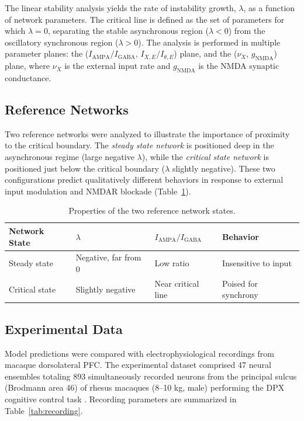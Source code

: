 \documentclass[11pt]{article}
\begin{document}
The linear stability analysis yields the rate of instability growth, $\lambda$, as a function of network parameters. The critical line is defined as the set of parameters for which $\lambda = 0$, separating the stable asynchronous region ($\lambda < 0$) from the oscillatory synchronous region ($\lambda > 0$). The analysis is performed in multiple parameter planes: the ($I_\text{AMPA}/I_\text{GABA}$, $I_{X,E}/I_{\theta,E}$) plane, and the ($\nu_X$, $g_\text{NMDA}$) plane, where $\nu_X$ is the external input rate and $g_\text{NMDA}$ is the NMDA synaptic conductance.

\subsection{Reference Networks}

Two reference networks were analyzed to illustrate the importance of proximity to the critical boundary. The \textit{steady state network} is positioned deep in the asynchronous regime (large negative $\lambda$), while the \textit{critical state network} is positioned just below the critical boundary ($\lambda$ slightly negative). These two configurations predict qualitatively different behaviors in response to external input modulation and NMDAR blockade (Table~\ref{tab:states}).

\begin{table}[htbp]
\centering
\caption{Properties of the two reference network states.}
\label{tab:states}
\begin{tabular}{llll}
\toprule
Network State & $\lambda$ & $I_\text{AMPA}/I_\text{GABA}$ & Behavior \\
\midrule
Steady state & Negative, far from 0 & Low ratio & Insensitive to input \\
Critical state & Slightly negative & Near critical line & Poised for synchrony \\
\bottomrule
\end{tabular}
\end{table}

\subsection{Experimental Data}

Model predictions were compared with electrophysiological recordings from macaque dorsolateral PFC. The experimental dataset comprised 47 neural ensembles totaling 893 simultaneously recorded neurons from the principal sulcus (Brodmann area 46) of rhesus macaques (8--10 kg, male) performing the DPX cognitive control task \citep{zick2018blocking, zick2021blocking}. Recording parameters are summarized in Table~\ref{tab:recording}.
\end{document}
